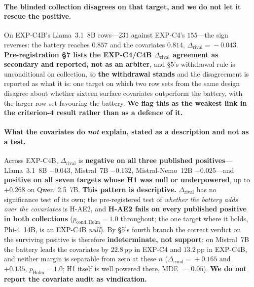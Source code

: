 \paragraph{The blinded collection disagrees on that target, and we do not let it rescue the positive.} On EXP-C4B's Llama~3.1~8B rows---$231$ against EXP-C4's $155$---the sign reverses: the battery reaches $0.857$ and the covariates $0.814$, $\Delta_{\mathrm{rival}}\!=\!-0.043$. \textbf{Pre-registration \S7 lists the EXP-C4/C4B $\Delta_{\mathrm{rival}}$ agreement as secondary and reported, not as an arbiter}, and \S5's withdrawal rule is unconditional on collection, so \textbf{the withdrawal stands} and the disagreement is reported as what it is: one target on which two row sets from the same design disagree about whether sixteen surface covariates outperform the battery, with the larger row set favouring the battery. \textbf{We flag this as the weakest link in the criterion-4 result rather than as a defence of it.}

\paragraph{What the covariates do \emph{not} explain, stated as a description and not as a test.} Across EXP-C4B, $\Delta_{\mathrm{rival}}$ is \textbf{negative on all three published positives}---Llama~3.1~8B $-0.043$, Mistral~7B $-0.132$, Mistral-Nemo~12B $-0.025$---and \textbf{positive on all seven targets whose H1 was null or underpowered}, up to $+0.268$ on Qwen~2.5~7B. \textbf{This pattern is descriptive.} $\Delta_{\mathrm{rival}}$ has no significance test of its own; the pre-registered test of \emph{whether the battery adds over the covariates} is H-AE2, and \textbf{H-AE2 fails on every published positive in both collections} ($p_{\mathrm{cond,Holm}}\!=\!1.0$ throughout; the one target where it holds, Phi-4~14B, is an EXP-C4B \emph{null}). By \S5's fourth branch the correct verdict on the surviving positive is therefore \textbf{indeterminate, not support}: on Mistral~7B the battery leads the covariates by $22.8$\,pp in EXP-C4 and $13.2$\,pp in EXP-C4B, and neither margin is separable from zero at these $n$ ($\Delta_{\mathrm{cond}}\!=\!+0.165$ and $+0.135$, $p_{\mathrm{Holm}}\!=\!1.0$; H1 itself is well powered there, MDE~$=\!0.05$). \textbf{We do not report the covariate audit as vindication.}

